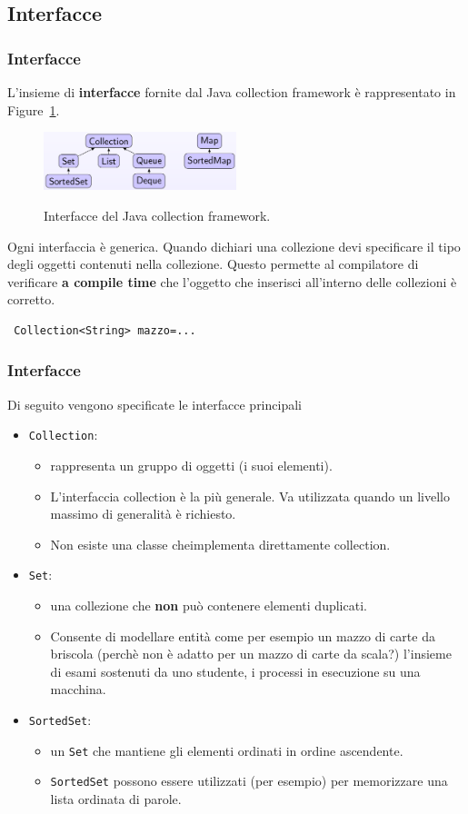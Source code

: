 \documentclass{beamer}
\begin{document}
\subsection{Interfacce}
\begin{frame}[fragile]
\frametitle{Interfacce}
L'insieme di \textbf{interfacce} fornite dal Java collection framework \`e rappresentato in Figure~\ref{Fig:collections}. 
\begin{figure}[h!]
  \centering
    \includegraphics[width=0.5\textwidth]{colls-coreInterfaces.png}
    \label{Fig:collections}
  \caption{Interfacce del  Java collection framework.}
\end{figure}
Ogni interfaccia \`e generica. Quando dichiari una collezione devi specificare il tipo degli oggetti contenuti nella collezione. Questo permette al compilatore di verificare \textbf{a compile time} che l'oggetto che inserisci all'interno delle collezioni \`e corretto. 
\begin{lstlisting}
 Collection<String> mazzo=...
\end{lstlisting}
\end{frame}
%
%
\begin{frame}[fragile]
\frametitle{Interfacce}
Di seguito vengono specificate le interfacce principali
\begin{itemize}
\item \texttt{Collection}: 
\begin{itemize}
\item rappresenta un gruppo di oggetti (i suoi elementi). 
\item L'interfaccia collection \`e la pi\`u generale. Va utilizzata quando un livello massimo di generalit\`a \`e richiesto. 
\item   Non esiste una classe cheimplementa direttamente collection. 
\end{itemize}
\item \texttt{Set}: 
\begin{itemize}
\item una collezione che \textbf{non} pu\`o contenere elementi duplicati.
\item Consente di modellare entit\`a come per esempio un mazzo di carte da briscola (perch\`e non \`e adatto per un mazzo di carte da scala?) l'insieme di esami sostenuti da uno studente, i processi in esecuzione su una macchina.
\end{itemize} 
\item \texttt{SortedSet}: 
\begin{itemize}
\item un \texttt{Set} che mantiene gli elementi ordinati in ordine ascendente.  
\item \texttt{SortedSet} possono essere utilizzati (per esempio) per memorizzare una lista ordinata di parole.
\end{itemize}
\end{itemize}
\end{frame}
\end{document}
